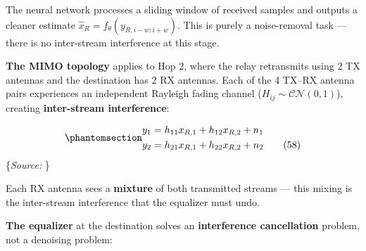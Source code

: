 \documentclass[
  english,
  12pt,
  12pt,
  a4paper,
  oneside]{report}
\begin{document}
The neural network processes a sliding window of received samples and outputs a cleaner estimate \(\hat{x}_R = f_\theta(y_{R,i-w:i+w})\). This is purely a noise-removal task --- there is no inter-stream interference at this stage.

\textbf{The MIMO topology} applies to Hop 2, where the relay retransmits using 2 TX antennas and the destination has 2 RX antennas. Each of the 4 TX--RX antenna pairs experiences an independent Rayleigh fading channel (\(H_{ij} \sim \mathcal{CN}(0,1)\)), creating \textbf{inter-stream interference}:

\begin{equation}\protect\phantomsection\label{eq:mimo-interference}{\begin{aligned}
y_1 &= h_{11} x_{R,1} + h_{12} x_{R,2} + n_1 \\
y_2 &= h_{21} x_{R,1} + h_{22} x_{R,2} + n_2
\tag{58}
\end{aligned}
}\end{equation} \footnotesize\{\textit{Source: \1}\}\normalsize

Each RX antenna sees a \textbf{mixture} of both transmitted streams --- this mixing is the inter-stream interference that the equalizer must undo.

\textbf{The equalizer} at the destination solves an \textbf{interference cancellation} problem, not a denoising problem:
\end{document}
